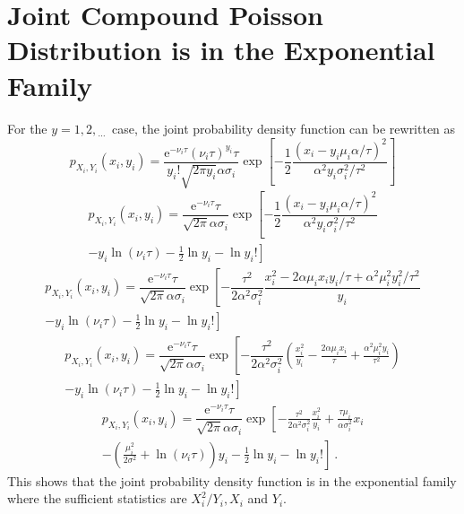\documentclass[12pt]{report}
\newcommand{\euler}{\mathrm{e}}
\newcommand{\dotdotdot}{_{\phantom{.}\cdots}}
\begin{document}
\section{Joint Compound Poisson Distribution is in the Exponential Family} \label{chapter:compoundPoisson_expFamily}
For the $y=1,2,\dotdotdot$ case, the joint probability density function can be rewritten as
\begin{equation*}
p_{X_i,Y_i}\left(x_i,y_i\right)=\dfrac{\euler^{-\nu_i\tau}(\nu_i\tau)^{y_i}\tau}{y_i!\sqrt{2\pi y_i}\alpha\sigma_i}
\exp\left[-\dfrac{1}{2}\dfrac{\left(x_i-y_i\mu_i\alpha/\tau\right)^2}{\alpha^2y_i\sigma_i^2/\tau^2}\right]
\end{equation*}
\begin{multline*}
p_{X_i,Y_i}\left(x_i,y_i\right)=\dfrac{\euler^{-\nu_i\tau}\tau}{\sqrt{2\pi}\alpha\sigma_i}
\exp\left[-\dfrac{1}{2}\dfrac{\left(x_i-y_i\mu_i\alpha/\tau\right)^2}{\alpha^2y_i\sigma_i^2/\tau^2}
\right.
\\
\left.
-y_i\ln(\nu_i\tau) -\frac{1}{2}\ln{y_i} - \ln{y_i!}\right]
\end{multline*}
\begin{multline*}
p_{X_i,Y_i}\left(x_i,y_i\right)=\dfrac{\euler^{-\nu_i\tau}\tau}{\sqrt{2\pi}\alpha\sigma_i}
\exp\left[-\dfrac{\tau^2}{2\alpha^2\sigma_i^2}\dfrac{x_i^2-2\alpha\mu_ix_iy_i/\tau+\alpha^2\mu_i^2y_i^2/\tau^2}{y_i}
\right.
\\
\left.
-y_i\ln(\nu_i\tau) -\frac{1}{2}\ln{y_i} - \ln{y_i!}\right]
\end{multline*}
\begin{multline*}
p_{X_i,Y_i}\left(x_i,y_i\right)=\dfrac{\euler^{-\nu_i\tau}\tau}{\sqrt{2\pi}\alpha\sigma_i}
\exp\left[-\dfrac{\tau^2}{2\alpha^2\sigma_i^2}\left(\frac{x_i^2}{y_i}-\frac{2\alpha\mu_ix_i}{\tau}+\frac{\alpha^2\mu_i^2y_i}{\tau^2}\right)
\right.
\\
\left.
-y_i\ln(\nu_i\tau) -\frac{1}{2}\ln{y_i} - \ln{y_i!}\right]
\end{multline*}
\begin{multline*}
p_{X_i,Y_i}\left(x_i,y_i\right)=\dfrac{\euler^{-\nu_i\tau}\tau}{\sqrt{2\pi}\alpha\sigma_i}
\exp\left[
-\frac{\tau^2}{2\alpha^2\sigma_i^2}\frac{x_i^2}{y_i}
+\frac{\tau\mu_i}{\alpha\sigma_i^2}x_i
\right.
\\
\left.
-\left(\frac{\mu_i^2}{2\sigma^2}+\ln(\nu_i\tau)\right)y_i
-\frac{1}{2}\ln{y_i}
-\ln{y_i!}
\right] \ .
\end{multline*}
This shows that the joint probability density function is in the exponential family where the sufficient statistics are $X_i^2/Y_i,X_i$ and $Y_i$.
\end{document}

